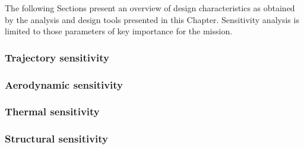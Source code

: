 The following Sections present an overview of design characteristics as obtained by the analysis and design tools presented in this Chapter. Sensitivity analysis is limited to those parameters of key importance for the mission.
\subsubsection{Trajectory sensitivity}\label{subsec:orbitsens}


\subsubsection{Aerodynamic sensitivity}\label{subsec:aerosens}


%

\subsubsection{Thermal sensitivity}\label{subsec:thermalsens}


\subsubsection{Structural sensitivity}\label{subsec:strucsens}






